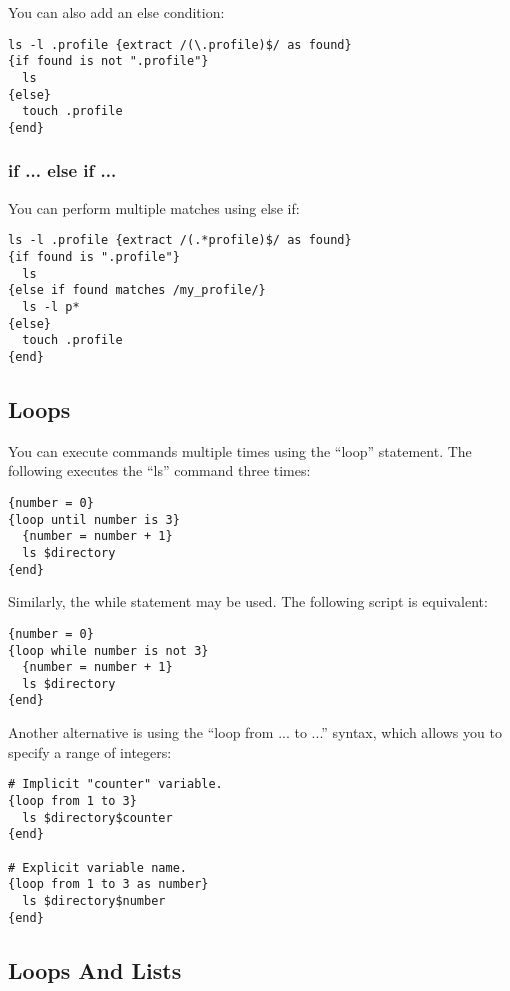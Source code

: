 You can also add an else condition: 

\begin{lstlisting}
ls -l .profile {extract /(\.profile)$/ as found}
{if found is not ".profile"}
  ls
{else}
  touch .profile
{end}
\end{lstlisting}


\subsubsection{if ... else if ...}

You can perform multiple matches using else if: 

\begin{lstlisting}
ls -l .profile {extract /(.*profile)$/ as found}
{if found is ".profile"}
  ls
{else if found matches /my_profile/}
  ls -l p*
{else}
  touch .profile
{end}
\end{lstlisting}


\subsection{Loops}

You can execute commands multiple times using the ``loop'' statement. The 
following \product executes the ``ls'' command three times: 

\begin{lstlisting}
{number = 0}
{loop until number is 3}
  {number = number + 1}
  ls $directory
{end}
\end{lstlisting}

Similarly, the while statement may be used. The following script is 
equivalent: 

\begin{lstlisting}
{number = 0}
{loop while number is not 3}
  {number = number + 1}
  ls $directory
{end}
\end{lstlisting}

Another alternative is using the ``loop from ... to ...'' syntax, which 
allows you to specify a range of integers: 

\begin{lstlisting}
# Implicit "counter" variable.
{loop from 1 to 3}
  ls $directory$counter
{end}

# Explicit variable name.
{loop from 1 to 3 as number}
  ls $directory$number
{end}
\end{lstlisting}


\subsection{Loops And Lists}

